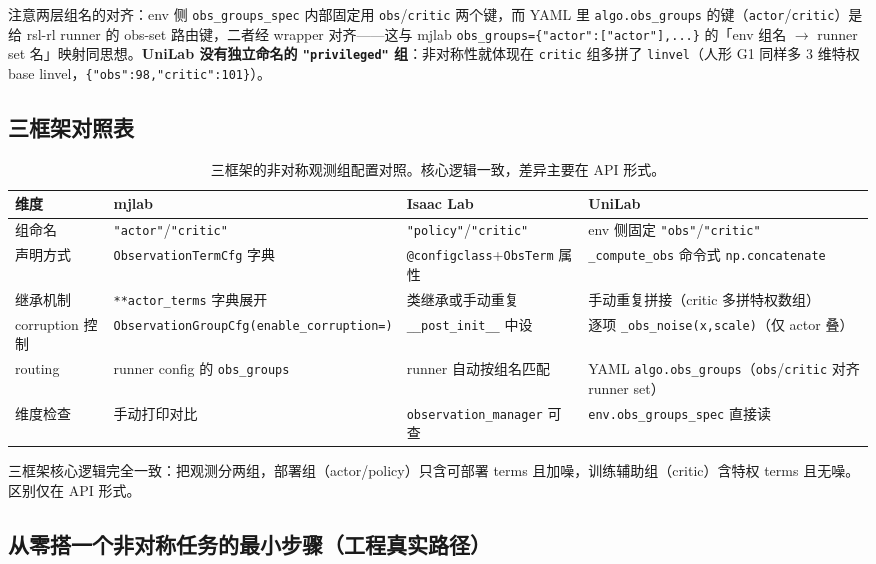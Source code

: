 注意两层组名的对齐：env 侧 \verb|obs_groups_spec| 内部固定用 \verb|obs|/\verb|critic| 两个键，而 YAML 里 \verb|algo.obs_groups| 的键（\verb|actor|/\verb|critic|）是给 rsl-rl runner 的 obs-set 路由键，二者经 wrapper 对齐——这与 mjlab \verb|obs_groups={"actor":["actor"],...}| 的「env 组名 $\to$ runner set 名」映射同思想。\textbf{UniLab 没有独立命名的 \texttt{"privileged"} 组}：非对称性就体现在 \verb|critic| 组多拼了 \verb|linvel|（人形 G1 同样多 3 维特权 base linvel，\verb|{"obs":98,"critic":101}|）。

\subsection{三框架对照表}
\label{sec:rlmc-priv-cfgtable}

\begin{table}[H]
\centering
\small
\caption{三框架的非对称观测组配置对照。核心逻辑一致，差异主要在 API 形式。}
\label{tab:rlmc-priv-cfgcompare}
\begin{tabular}{@{}p{2.4cm}p{3.4cm}p{3.4cm}p{2.6cm}@{}}
\toprule
维度 & mjlab & Isaac Lab & UniLab \\
\midrule
组命名 & \texttt{"actor"}/\texttt{"critic"} & \texttt{"policy"}/\texttt{"critic"} & env 侧固定 \texttt{"obs"}/\texttt{"critic"} \\
声明方式 & \texttt{ObservationTermCfg} 字典 & \texttt{@configclass}+\texttt{ObsTerm} 属性 & \texttt{\_compute\_obs} 命令式 \texttt{np.concatenate} \\
继承机制 & \texttt{**actor\_terms} 字典展开 & 类继承或手动重复 & 手动重复拼接（critic 多拼特权数组） \\
corruption 控制 & \texttt{ObservationGroupCfg(enable\_corruption=)} & \texttt{\_\_post\_init\_\_} 中设 & 逐项 \texttt{\_obs\_noise(x,scale)}（仅 actor 叠） \\
routing & runner config 的 \texttt{obs\_groups} & runner 自动按组名匹配 & YAML \texttt{algo.obs\_groups}（\texttt{obs}/\texttt{critic} 对齐 runner set） \\
维度检查 & 手动打印对比 & \texttt{observation\_manager} 可查 & \texttt{env.obs\_groups\_spec} 直接读 \\
\bottomrule
\end{tabular}
\end{table}

三框架核心逻辑完全一致：把观测分两组，部署组（actor/policy）只含可部署 terms 且加噪，训练辅助组（critic）含特权 terms 且无噪。区别仅在 API 形式。

\subsection{从零搭一个非对称任务的最小步骤（工程真实路径）}
\label{sec:rlmc-priv-fromzero}

